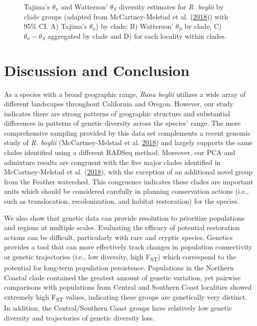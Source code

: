\documentclass[proquest,12pt,final]{ucthesis-CA2012} %
\begin{document}
\begin{ucmainmatter}
\begin{figure}
{}

\caption{Tajima's \(\theta_\pi\) and Watterson' \(\theta_S\)
diversity estimates for \emph{R. boylii} by clade groups (adapted from
McCartney-Melstad et al.
(\protect\hyperlink{ref-mccartney-melstad_population_2018}{2018})) with
95\% CI. A) Tajima's \(\theta_\pi\)) by clade; B) Watterson'
\(\theta_S\) by clade; C) \(\theta_\pi - \theta_S\) aggregated by clade
and D) for each locality within clades.}\label{fig:CH3F6thetas}
\end{figure}
\clearpage

\hypertarget{discussion-and-conclusion}{%
\section{Discussion and Conclusion}\label{discussion-and-conclusion}}

As a species with a broad geographic range, \emph{Rana boylii} utilizes
a wide array of different landscapes throughout California and Oregon.
However, our study indicates there are strong patterns of geographic
structure and substantial differences in patterns of genetic diversity
across the species' range. The more comprehensive sampling provided by
this data set complements a recent genomic study of \emph{R. boylii}
(McCartney-Melstad et al.
\protect\hyperlink{ref-mccartney-melstad_population_2018}{2018}) and
largely supports the same clades identified using a different RADSeq
method. Moreover, our PCA and admixture results are congruent with the
five major clades identified in McCartney-Melstad et al.
(\protect\hyperlink{ref-mccartney-melstad_population_2018}{2018}), with
the exception of an additional novel group from the Feather watershed.
This congruence indicates these clades are important units which should
be considered carefully in planning conservation actions (i.e., such as
translocation, recolonization, and habitat restoration) for the species.

We also show that genetic data can provide resolution to prioritize
populations and regions at multiple scales. Evaluating the efficacy of
potential restoration actions can be difficult, particularly with rare
and cryptic species. Genetics provides a tool that can more effectively
track changes in population connectivity or genetic trajectories (i.e.,
low diversity, high F\textsubscript{ST}) which correspond to the
potential for long-term population persistence. Populations in the
Northern Coastal clade contained the greatest amount of genetic
variation, yet pairwise comparisons with populations from Central and
Southern Coast localities showed extremely high F\textsubscript{ST}
values, indicating these groups are genetically very distinct. In
addition, the Central/Southern Coast groups have relatively low genetic
diversity and trajectories of genetic diversity loss.


\end{ucmainmatter}
\end{document}
